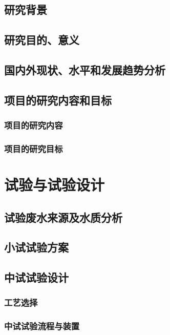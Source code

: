 {}
\subsection{研究背景}

\subsection{研究目的、意义}

\subsection{国内外现状、水平和发展趋势分析}

\subsection{项目的研究内容和目标}
\subsubsection{项目的研究内容}

\subsubsection{项目的研究目标}

{\centering\section{试验与试验设计}}
\subsection{试验废水来源及水质分析}
\lipsum
\subsection{小试试验方案}
\lipsum
\subsection{中试试验设计}
\subsubsection{工艺选择}
\lipsum
\subsubsection{中试试验流程与装置}
\lipsum
